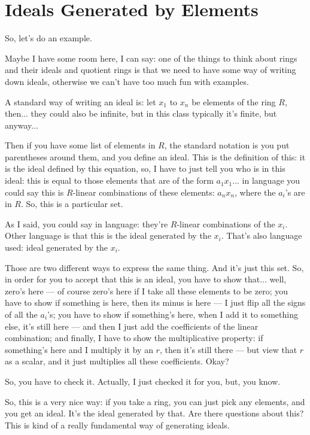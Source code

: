 \section{Ideals Generated by Elements}

\begin{speech}[01:10:37 - 01:12:08]
So, let's do an example.

Maybe I have some room here, I can say: one of the things to think about rings and their ideals and quotient rings is that we need to have some way of writing down ideals, otherwise we can't have too much fun with examples. 

A standard way of writing an ideal is: let $x_1$ to $x_n$ be elements of the ring $R$,  then... they could also be infinite, but in this class typically it's finite, but anyway...

Then if you have some list of elements in $R$, the standard notation is you put parentheses around them, and you define an ideal. This is the definition of this: it is the ideal defined by this equation,  so, I have to just tell you who is in this ideal: this is equal to those elements that are of the form $a_1 x_1$... in language you could say this is $R$-linear combinations of these elements: $a_n x_n$, where the $a_i$'s are in $R$.  So, this is a particular set.
\end{speech}

\begin{speech}[01:12:08 - 01:13:39]
As I said, you could say in language: they're $R$-linear combinations of the $x_i$.  Other language is that this is the ideal generated by the $x_i$. That's also language used: ideal generated by the $x_i$.  

Those are two different ways to express the same thing. And it's just this set. So, in order for you to accept that this is an ideal, you have to show that... well, zero's here --- of course zero's here if I take all these elements to be zero; you have to show if something is here, then its minus is here --- I just flip all the signs of all the $a_i$'s; you have to show if something's here, when I add it to something else, it's still here --- and then I just add the coefficients of the linear combination; and finally, I have to show the multiplicative property: if something's here and I multiply it by an $r$, then it's still there --- but view that $r$ as a scalar, and it just multiplies all these coefficients. Okay? 

So, you have to check it. Actually, I just checked it for you, but, you know. 

So, this is a very nice way: if you take a ring, you can just pick any elements, and you get an ideal. It's the ideal generated by that. Are there questions about this? This is kind of a really fundamental way of generating ideals.
\end{speech}

